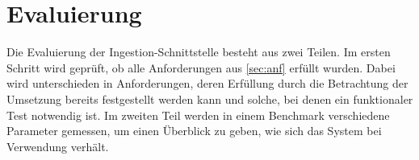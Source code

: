 \chapter{Evaluierung}

Die Evaluierung der Ingestion-Schnittstelle besteht aus zwei Teilen.
Im ersten Schritt wird geprüft, ob alle Anforderungen aus \cref{sec:anf} erfüllt wurden.
Dabei wird unterschieden in Anforderungen, deren Erfüllung durch die Betrachtung der Umsetzung bereits festgestellt werden kann und solche, bei denen ein funktionaler Test notwendig ist.
Im zweiten Teil werden in einem Benchmark verschiedene Parameter gemessen, um einen Überblick zu geben, wie sich das System bei Verwendung verhält.


